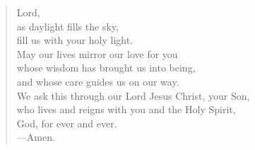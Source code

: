 \prayer

\setlength{\vleftmargin}{\prayerleftmargini}

\begin{verse}
Lord,\\
as daylight fills the sky,\\
fill us with your holy light.\\
May our lives mirror our love for you\\
whose wisdom has brought us into being,\\
and whose care guides us on our way.\\
We ask this through our Lord Jesus Christ, your Son,\\
who lives and reigns with you and the Holy Spirit,\\
God, for ever and ever.\\
{\color{red}---\thinspace}Amen.
\end{verse}

\setlength{\vleftmargin}{\defleftmargini}